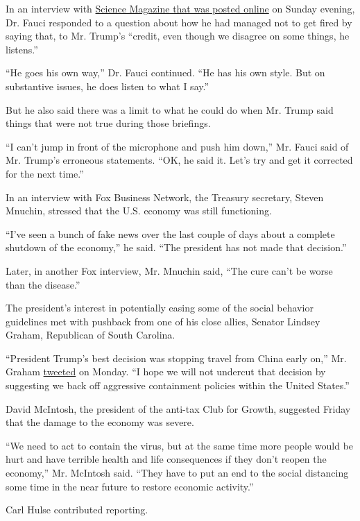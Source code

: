 In an interview with
\href{https://www.sciencemag.org/news/2020/03/i-m-going-keep-pushing-anthony-fauci-tries-make-white-house-listen-facts-pandemic}{Science
Magazine that was posted online} on Sunday evening, Dr. Fauci responded
to a question about how he had managed not to get fired by saying that,
to Mr. Trump's ``credit, even though we disagree on some things, he
listens.''

``He goes his own way,'' Dr. Fauci continued. ``He has his own style.
But on substantive issues, he does listen to what I say.''

But he also said there was a limit to what he could do when Mr. Trump
said things that were not true during those briefings.

``I can't jump in front of the microphone and push him down,'' Mr. Fauci
said of Mr. Trump's erroneous statements. ``OK, he said it. Let's try
and get it corrected for the next time.''

In an interview with Fox Business Network, the Treasury secretary,
Steven Mnuchin, stressed that the U.S. economy was still functioning.

``I've seen a bunch of fake news over the last couple of days about a
complete shutdown of the economy,'' he said. ``The president has not
made that decision.''

Later, in another Fox interview, Mr. Mnuchin said, ``The cure can't be
worse than the disease.''

The president's interest in potentially easing some of the social
behavior guidelines met with pushback from one of his close allies,
Senator Lindsey Graham, Republican of South Carolina.

``President Trump's best decision was stopping travel from China early
on,'' Mr. Graham
\href{https://twitter.com/LindseyGrahamSC/status/1242082517223645184}{tweeted}
on Monday. ``I hope we will not undercut that decision by suggesting we
back off aggressive containment policies within the United States.''

David McIntosh, the president of the anti-tax Club for Growth, suggested
Friday that the damage to the economy was severe.

``We need to act to contain the virus, but at the same time more people
would be hurt and have terrible health and life consequences if they
don't reopen the economy,'' Mr. McIntosh said. ``They have to put an end
to the social distancing some time in the near future to restore
economic activity.''

Carl Hulse contributed reporting.

